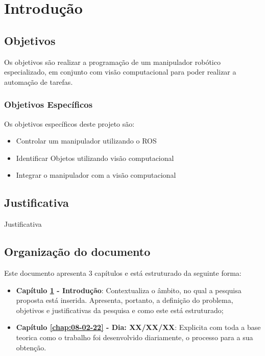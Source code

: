 \chapter{Introdução}
\label{chap:intro}




\section{Objetivos}
\label{sec:obj}
Os objetivos são realizar a programação de um manipulador robótico especializado, em conjunto com visão computacional para poder realizar a automação de tarefas.
\label{sec:obj}

\subsection{Objetivos Específicos}
\label{ssec:objesp}
Os objetivos específicos deste projeto são:
\begin{itemize}
      \item Controlar um manipulador utilizando o ROS
      \item Identificar Objetos utilizando visão computacional
      \item Integrar o manipulador com a visão computacional
  \end{itemize}



\section{Justificativa}
\label{sec:justi}

Justificativa

\section{Organização do documento}
\label{section:organizacao}

Este documento apresenta $3$ capítulos e está estruturado da seguinte forma:

\begin{itemize}

  \item \textbf{Capítulo \ref{chap:intro} - Introdução}: Contextualiza o âmbito, no qual a pesquisa proposta está inserida. Apresenta, portanto, a definição do problema, objetivos e justificativas da pesquisa e como este \thetypeworkthree está estruturado;
  \item \textbf{Capítulo \ref{chap:08-02-22} - Dia: XX/XX/XX}: Explicita com toda a base teorica como o trabalho foi desenvolvido diariamente, o processo para a sua obtenção.

\end{itemize}

